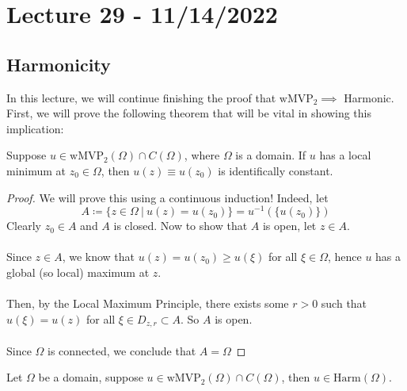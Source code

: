 \section{Lecture 29 - 11/14/2022}

\subsection{Harmonicity}

In this lecture, we will continue finishing the proof that $\text{wMVP}_2 \implies $ Harmonic. First, we will prove the following theorem that will be vital in showing this implication:

\begin{theorem}
Suppose $u \in \text{wMVP}_2(\Omega) \cap C(\Omega)$, where $\Omega$ is a domain. If $u$ has a local minimum at $z_0 \in \Omega$, then $u(z) \equiv u(z_0)$ is identifically constant.
\end{theorem}

\begin{proof}
    We will prove this using a continuous induction! Indeed, let
    \[A \coloneqq \{z \in \Omega\ |\ u(z) = u(z_0)\} = u^{-1}(\{u(z_0)\})\]
    Clearly $z_0 \in A$ and $A$ is closed. Now to show that $A$ is open, let $z \in A$.\\\\
    Since $z \in A$, we know that $u(z) = u(z_0) \geq u(\xi)$ for all $\xi \in \Omega$, hence $u$ has a global (so local) maximum at $z$.\\\\
    Then, by the Local Maximum Principle, there exists some $r > 0$ such that $u(\xi) = u(z)$ for all $\xi \in D_{z, r} \subset A$. So $A$ is open.\\\\
    Since $\Omega$ is connected, we conclude that $A = \Omega$
\end{proof}

\begin{theorem}
    Let $\Omega$ be a domain, suppose $u \in \text{wMVP}_2(\Omega) \cap C(\Omega)$, then $u \in \text{Harm}(\Omega)$. 
\end{theorem}

